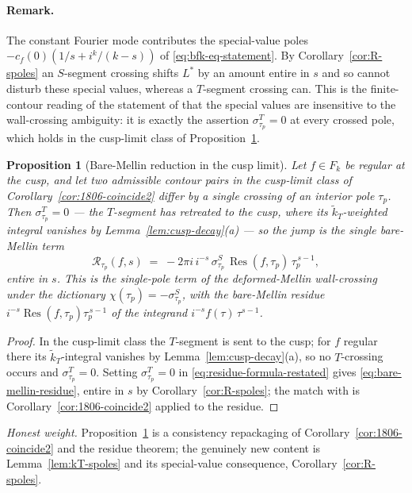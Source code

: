 \documentclass[11pt]{article}
\newtheorem{proposition}[theorem]{Proposition}
\numberwithin{equation}{section}  %
\DeclareMathOperator{\Res}{Res}
\begin{document}
\paragraph{Remark.}
The constant Fourier mode contributes the special-value poles
$-c_f(0)(1/s + i^k/(k-s))$ of \eqref{eq:bfk-eq-statement}.  By
Corollary~\ref{cor:R-spoles} an $S$-segment crossing shifts $L^*$ by an
amount entire in $s$ and so cannot disturb these special values, whereas
a $T$-segment crossing can.  This is the finite-contour reading of the
statement of \cite[\S2.4]{1806} that the special values are insensitive
to the wall-crossing ambiguity: it is exactly the assertion
$\sigma^T_{\tau_p} = 0$ at every crossed pole, which holds in the
cusp-limit class of Proposition~\ref{prop:1806-reduction}.

\begin{proposition}[Bare-Mellin reduction in the cusp limit]\label{prop:1806-reduction}
Let $f \in F_k$ be regular at the cusp, and let two admissible contour
pairs in the cusp-limit class of Corollary~\ref{cor:1806-coincide2}
differ by a single crossing of an interior pole $\tau_p$.  Then
$\sigma^T_{\tau_p} = 0$ --- the $T$-segment has retreated to the cusp,
where its $\widetilde{k}_T$-weighted integral vanishes by
Lemma~\ref{lem:cusp-decay}(a) --- so the jump is the single bare-Mellin
term
\begin{equation}\label{eq:bare-mellin-residue}
  \mathcal{R}_{\tau_p}(f, s)
  \;=\; -2\pi i\,i^{-s}\,\sigma^S_{\tau_p}\,\Res(f, \tau_p)\,\tau_p^{\,s-1},
\end{equation}
entire in $s$.  This is the single-pole term of the deformed-Mellin
wall-crossing \cite[Eq.~(2.65)]{1806} under the dictionary
$\chi(\tau_p) = -\sigma^S_{\tau_p}$, with the bare-Mellin residue
$i^{-s}\Res(f, \tau_p)\tau_p^{\,s-1}$ of the integrand
$i^{-s} f(\tau)\,\tau^{s-1}$.
\end{proposition}
\begin{proof}
In the cusp-limit class the $T$-segment is sent to the cusp; for
$f$ regular there its $\widetilde{k}_T$-integral vanishes by
Lemma~\ref{lem:cusp-decay}(a), so no $T$-crossing occurs and
$\sigma^T_{\tau_p} = 0$.  Setting $\sigma^T_{\tau_p} = 0$ in
\eqref{eq:residue-formula-restated} gives
\eqref{eq:bare-mellin-residue}, entire in $s$ by
Corollary~\ref{cor:R-spoles}; the match with \cite[Eq.~(2.65)]{1806} is
Corollary~\ref{cor:1806-coincide2} applied to the residue.
\end{proof}

\noindent\emph{Honest weight.}  Proposition~\ref{prop:1806-reduction} is
a consistency repackaging of Corollary~\ref{cor:1806-coincide2} and the
residue theorem; the genuinely new content is
Lemma~\ref{lem:kT-spoles} and its special-value consequence,
Corollary~\ref{cor:R-spoles}.
\end{document}
